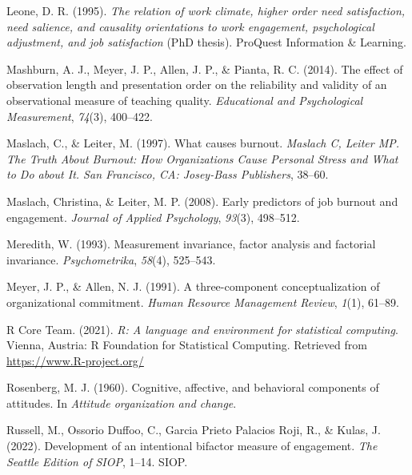 \documentclass[
  man]{apa6}
\newlength{\cslhangindent}
\newlength{\cslentryspacingunit} %
\newenvironment{CSLReferences}[2] %
 {%
  \setlength{\parindent}{0pt}
  \ifodd #1
  \let\oldpar\par
  \def\par{\hangindent=\cslhangindent\oldpar}
  \fi
  \setlength{\parskip}{#2\cslentryspacingunit}
 }%
 {}
\begin{document}
\begin{CSLReferences}{1}{0}
\leavevmode{}%
Leone, D. R. (1995). \emph{The relation of work climate, higher order need satisfaction, need salience, and causality orientations to work engagement, psychological adjustment, and job satisfaction} (PhD thesis). ProQuest Information \& Learning.

\leavevmode{}%
Mashburn, A. J., Meyer, J. P., Allen, J. P., \& Pianta, R. C. (2014). The effect of observation length and presentation order on the reliability and validity of an observational measure of teaching quality. \emph{Educational and Psychological Measurement}, \emph{74}(3), 400--422.

\leavevmode{}%
Maslach, C., \& Leiter, M. (1997). What causes burnout. \emph{Maslach C, Leiter MP. The Truth About Burnout: How Organizations Cause Personal Stress and What to Do about It. San Francisco, CA: Josey-Bass Publishers}, 38--60.

\leavevmode{}%
Maslach, Christina, \& Leiter, M. P. (2008). Early predictors of job burnout and engagement. \emph{Journal of Applied Psychology}, \emph{93}(3), 498--512.

\leavevmode{}%
Meredith, W. (1993). Measurement invariance, factor analysis and factorial invariance. \emph{Psychometrika}, \emph{58}(4), 525--543.

\leavevmode{}%
Meyer, J. P., \& Allen, N. J. (1991). A three-component conceptualization of organizational commitment. \emph{Human Resource Management Review}, \emph{1}(1), 61--89.

\leavevmode{}%
R Core Team. (2021). \emph{R: A language and environment for statistical computing}. Vienna, Austria: R Foundation for Statistical Computing. Retrieved from \url{https://www.R-project.org/}

\leavevmode{}%
Rosenberg, M. J. (1960). Cognitive, affective, and behavioral components of attitudes. In \emph{Attitude organization and change}.

\leavevmode{}%
Russell, M., Ossorio Duffoo, C., Garcia Prieto Palacios Roji, R., \& Kulas, J. (2022). Development of an intentional bifactor measure of engagement. \emph{The Seattle Edition of SIOP}, 1--14. SIOP.


\end{CSLReferences}
\end{document}

